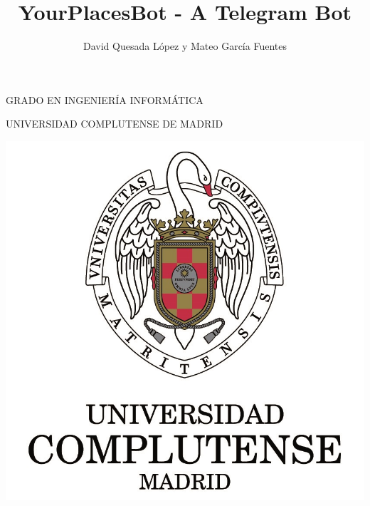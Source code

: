 \documentclass{article}
\title{YourPlacesBot - A Telegram Bot}
\author{David Quesada L\'opez y Mateo Garc\'ia Fuentes}
\begin{document}
\maketitle
\centering

GRADO EN INGENIER\'IA INFORM\'ATICA %

UNIVERSIDAD COMPLUTENSE DE MADRID

\includegraphics{logo.jpg}
\end{document}
